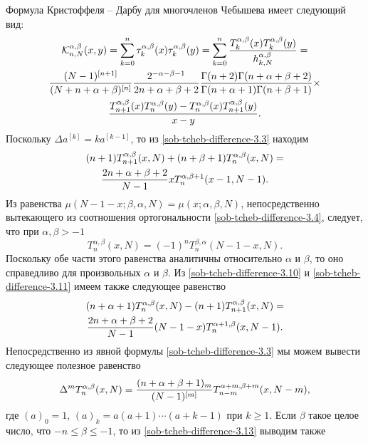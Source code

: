 Формула Кристоффеля -- Дарбу  для многочленов Чебышева  имеет следующий вид:
\begin{multline}
\mathcal{K}_{n,N}^{\alpha,\beta}(x,y)=\sum_{k=0}^n\tau_k^{\alpha,\beta}(x)\tau_k^{\alpha,\beta}(y)=
\sum_{k=0}^n{T_k^{\alpha,\beta}(x)T_k^{\alpha,\beta}(y)\over
h_{k,N}^{\alpha,\beta}}=\\
{(N-1)^{[n+1]}\over
(N+n+\alpha+\beta)^{[n]}} {2^{-\alpha-\beta-1}\over
2n+\alpha+\beta+2} {\Gamma(n+2)\Gamma(n+\alpha+\beta+2)\over
\Gamma(n+\alpha+1)\Gamma(n+\beta+1)}\times\\
{T_{n+1}^{\alpha,\beta}(x)T_n^{\alpha,\beta}(y)-
T_n^{\alpha,\beta}(x)T_{n+1}^{\alpha,\beta}(y)\over x-y}.\label{sob-tcheb-difference-3.9}
\end{multline}
Поскольку $\Delta a^{[k]}=ka^{[k-1]}$, то из \eqref{sob-tcheb-difference-3.3} находим
\begin{multline}
(n+1)T_{n+1}^{\alpha,\beta}(x,N)+(n+\beta+1)T_n^{\alpha, \beta}(x,N)=\\
{2n+\alpha+\beta+2\over N-1}xT_n^{\alpha,\beta+1}(x-1,N-1). \label{sob-tcheb-difference-3.10}
\end{multline}
 Из равенства $\mu(N-1-x;\beta,\alpha,N)=\mu(x;\alpha,\beta,N)$, непосредственно
вытекающего из  соотношения ортогональности \eqref{sob-tcheb-difference-3.4}, следует,
что при $\alpha,\beta>-1$
 \begin{equation}
T_n^{\alpha,\beta}(x,N)=(-1)^nT_n^{\beta,\alpha}(N-1-x,N). \label{sob-tcheb-difference-3.11}
 \end{equation}
  Поскольку обе части этого равенства аналитичны
относительно $\alpha$ и $\beta$, то оно справедливо для произвольных
$\alpha$ и $\beta$. Из \eqref{sob-tcheb-difference-3.10} и \eqref{sob-tcheb-difference-3.11} имеем также следующее
     равенство
\begin{multline}
(n+\alpha+1)T_n^{\alpha,\beta}(x,N)-(n+1)T_{n+1}^{\alpha,\beta}(x,N)=\\
{2n+\alpha+\beta+2\over   N-1}(N-1-x)T_n^{\alpha+1,
\beta}(x,N-1). \label{sob-tcheb-difference-3.12}
\end{multline}
  Непосредственно из явной формулы \eqref{sob-tcheb-difference-3.3} мы можем вывести следующее
     полезное равенство
\begin{equation}
\Delta^m T_n^{\alpha,\beta}(x,N)={(n+\alpha+\beta+1)_m\over
(N-1)^{[m]}} T_{n-m}^{\alpha+m,\beta+m}(x,N-m),\label{sob-tcheb-difference-3.13}
\end{equation}
где $(a)_0=1$, $(a)_k=a(a+1)\cdots(a+k-1)$ при $k\ge1$. Если $\beta$
такое целое число, что $-n\le\beta\le-1$, то из \eqref{sob-tcheb-difference-3.13} выводим также
